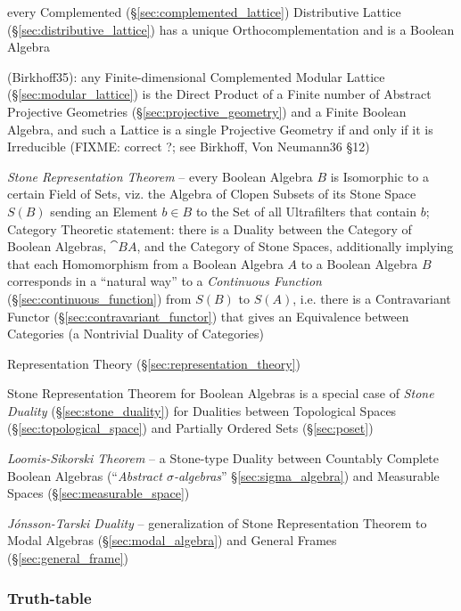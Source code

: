 every Complemented (\S\ref{sec:complemented_lattice}) Distributive Lattice
(\S\ref{sec:distributive_lattice}) has a unique Orthocomplementation and is a
Boolean Algebra

(Birkhoff35): any Finite-dimensional Complemented Modular Lattice
(\S\ref{sec:modular_lattice}) is the Direct Product of a Finite number of
Abstract Projective Geometries (\S\ref{sec:projective_geometry}) and a Finite
Boolean Algebra, and such a
Lattice is a single Projective Geometry if and only if it is Irreducible
(FIXME: correct ?; see Birkhoff, Von Neumann36 \S 12)

\emph{Stone Representation Theorem} -- every Boolean Algebra $B$ is Isomorphic
to a certain Field of Sets, viz. the Algebra of Clopen Subsets of its Stone
Space $\xspace{S}(B)$ sending an Element $b \in B$ to the Set of all
Ultrafilters that contain $b$; Category Theoretic statement: there is a Duality
between the Category of Boolean Algebras, $\cat{BA}$, and the Category of Stone
Spaces, additionally implying that each Homomorphism from a Boolean Algebra $A$
to a Boolean Algebra $B$ corresponds in a ``natural way'' to a \emph{Continuous
  Function} (\S\ref{sec:continuous_function}) from $S(B)$ to $S(A)$, i.e. there
is a Contravariant Functor (\S\ref{sec:contravariant_functor}) that gives an
Equivalence between Categories (a Nontrivial Duality of Categories)

\fist Representation Theory (\S\ref{sec:representation_theory})

\fist Stone Representation Theorem for Boolean Algebras is a special case of
\emph{Stone Duality} (\S\ref{sec:stone_duality}) for Dualities between
Topological Spaces (\S\ref{sec:topological_space}) and Partially Ordered Sets
(\S\ref{sec:poset})

\emph{Loomis-Sikorski Theorem} -- a Stone-type Duality between Countably
Complete Boolean Algebras (``\emph{Abstract $\sigma$-algebras}''
\S\ref{sec:sigma_algebra}) and Measurable Spaces (\S\ref{sec:measurable_space})

\fist \emph{J\'onsson-Tarski Duality} --
generalization of Stone Representation Theorem to Modal Algebras
(\S\ref{sec:modal_algebra}) and General Frames (\S\ref{sec:general_frame})



\subsubsection{Truth-table}\label{sec:truth_table}

